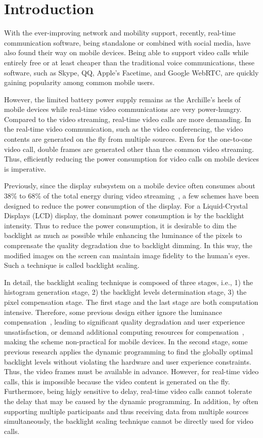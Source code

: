\section{Introduction}


With the ever-improving network and mobility support, recently,
real-time communication software, being standalone or combined with
social media, have also found their way on mobile devices.  Being able
to support video calls while entirely free or at least cheaper than
the traditional voice communications, these software, such as Skype,
QQ, Apple's Facetime, and Google WebRTC, are quickly gaining
popularity among common mobile users.

However, the limited battery power supply remains as the Archille's
heels of mobile devices while real-time video communications are very
power-hungry. Compared to the video streaming, real-time video calls
are more demanding. In the real-time video communication, such as the
video conferencing, the video contents are generated on the fly from
multiple sources. Even for the one-to-one video call, double frames
are generated other than the common video streaming. Thus, efficiently
reducing the power consumption for video calls on mobile devices is
imperative.


Previously, since the display subsystem on a mobile device often
consumes about 38\% to 68\% of the total energy during video
streaming~\cite{AG10}, a few schemes have been designed to reduce the
power consumption of the display. For a Liquid-Crystal Displays (LCD)
display, the dominant power consumption is by the backlight
intensity. Thus to reduce the power consumption, it is desirable to
dim the backlight as much as possible while enhancing the luminance of
the pixels to comprensate the quality degradation due to backlight
dimming.  In this way, the modified images on the screen can maintain
image fidelity to the human's eyes. Such a technique is called
backlight scaling.

In detail, the backlight scaling technique is composed of three
stages, i.e., 1) the histogram generation stage, 2) the backlight
levels determination stage, 3) the pixel compensation stage. The first
stage and the last stage are both computation intensive. Therefore,
some previous design either ignore the luminance
compensation~\cite{HLH11}, leading to significant quality degradation
and user experience unsatisfaction, or demand additional computing
resources for compensation~\cite{LHH14}, making the scheme
non-practical for mobile devices.  In the second stage, some previous
research applies the dynamic programming to find the globally optimal
backlight levels without violating the hardware and user experience
constraints. Thus, the video frames must be available in advance.
However, for real-time video calls, this is impossible because the
video content is generated on the fly.  Furthermore, being higly
sensitive to delay, real-time video calls cannot tolerate the delay
that may be caused by the dynamic programming. In addition, by often
supporting multiple participants and thus receiving data from multiple
sources simultaneously, the backlight scaling technique cannot be
directly used for video calls.

